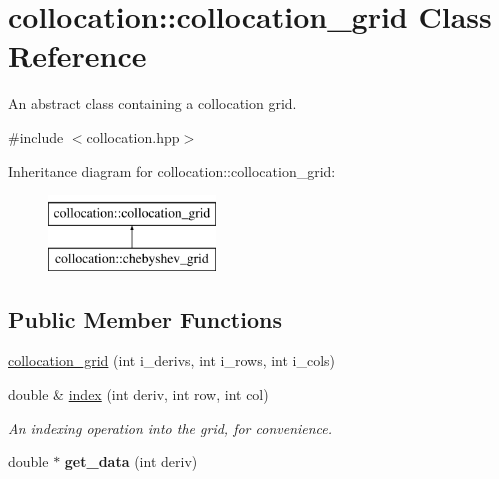 \hypertarget{classcollocation_1_1collocation__grid}{\section{collocation\-:\-:collocation\-\_\-grid Class Reference}
\label{classcollocation_1_1collocation__grid}
}


An abstract class containing a collocation grid.  




{\ttfamily \#include $<$collocation.\-hpp$>$}

Inheritance diagram for collocation\-:\-:collocation\-\_\-grid\-:\begin{figure}[H]
\begin{center}
\leavevmode
\includegraphics[height=2.000000cm]{classcollocation_1_1collocation__grid}
\end{center}
\end{figure}
\subsection*{Public Member Functions}
\begin{DoxyCompactItemize}
\item 
\hyperlink{classcollocation_1_1collocation__grid_ac579840eb302c73265bcf6bb0d050da2}{collocation\-\_\-grid} (int i\-\_\-derivs, int i\-\_\-rows, int i\-\_\-cols)
\item 
double \& \hyperlink{classcollocation_1_1collocation__grid_ae4c6823908ca97d0302ee8bdef30f996}{index} (int deriv, int row, int col)
\begin{DoxyCompactList}\small\item\em An indexing operation into the grid, for convenience. \end{DoxyCompactList}\item 
\hypertarget{classcollocation_1_1collocation__grid_a6f1a7584de56f404ace53d98f1d68437}{double $\ast$ {\bfseries get\-\_\-data} (int deriv)}\label{classcollocation_1_1collocation__grid_a6f1a7584de56f404ace53d98f1d68437}

\end{DoxyCompactItemize}
